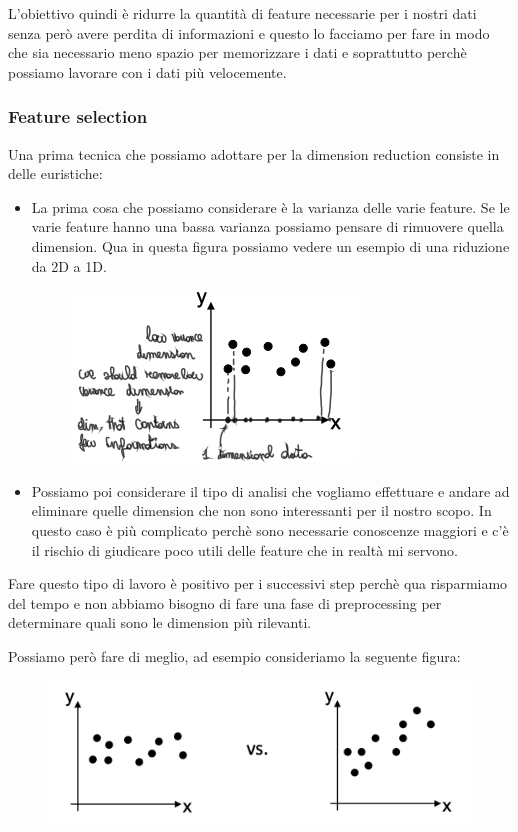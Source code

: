 \documentclass[14pt]{extreport}
\begin{document}
L'obiettivo quindi è ridurre la quantità di feature necessarie per i nostri dati senza però avere perdita di informazioni e questo lo facciamo per
fare in modo che sia necessario meno spazio per memorizzare i dati e soprattutto perchè possiamo lavorare con i dati più velocemente.


\subsubsection{Feature selection}

Una prima tecnica che possiamo adottare per la dimension reduction consiste in delle euristiche:

\begin{itemize}
	\item La prima cosa che possiamo considerare è la varianza delle varie feature. Se le varie feature hanno una bassa varianza possiamo pensare di
	      rimuovere quella dimension. Qua in questa figura possiamo vedere un esempio di una riduzione da 2D a 1D.
	      \begin{figure}[H]
		      \centering
		      \includegraphics[width=0.7\linewidth]{436.jpeg}
	      \end{figure}
	\item Possiamo poi considerare il tipo di analisi che vogliamo effettuare e andare ad eliminare quelle dimension che non sono interessanti per il
	      nostro scopo. In questo caso è più complicato perchè sono necessarie conoscenze maggiori e c'è il rischio di giudicare poco utili delle
	      feature che in realtà mi servono.
\end{itemize}

Fare questo tipo di lavoro è positivo per i successivi step perchè qua risparmiamo del tempo e non abbiamo bisogno di fare una fase di preprocessing
per determinare quali sono le dimension più rilevanti.

Possiamo però fare di meglio, ad esempio consideriamo la seguente figura:
\begin{figure}[H]
	\centering
	\includegraphics[width=0.7\linewidth]{437.jpeg}
\end{figure}
\end{document}
